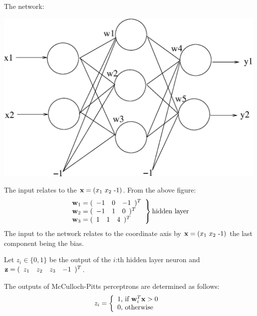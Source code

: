 \documentclass[10pt]{article}
\newcommand{\vect}[1]{{\bf{#1}}}
\begin{document}
\begin{enumerate}
The network:
\begin{center}
\includegraphics[scale=0.35]{e61-2.eps}
\end{center}
%
The input relates to the   ${\bf x} = (x_1\ x_2\ \mbox{-1})$.
From the above figure:
\begin{equation*}
\left.
\begin{array}{l}
\vect{w}_1=(\begin{array}{ccc}-1&0&-1\end{array})^T\\
\vect{w}_2=(\begin{array}{ccc}-1&1&0\end{array})^T\\
\vect{w}_3=(\begin{array}{ccc}1&1&4\end{array})^T
\end{array}\right\}\mbox{hidden layer}
\end{equation*}
The input to the network relates to the coordinate axis by ${\bf x} = (x_1\ x_2\ \mbox{-1})$ the
last component being the bias.

Let $z_i \in\{0,1\}$ be the output of the $i$:th hidden layer neuron and $\vect{z}=(\begin{array}{cccc}z_1&z_2&z_3&-1\end{array})^T$.

The outputs of McCulloch-Pitts perceptrons are determined as follows:
\begin{equation*}
z_i=\left\{\begin{array}{l}
1 \mbox{, if }\vect{w}_i^T\vect{x} > 0\\
0 \mbox{, otherwise}
\end{array}\right.
\end{equation*}


\end{enumerate}
\end{document}
